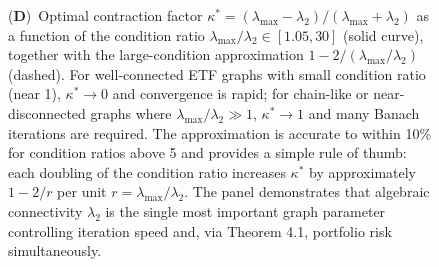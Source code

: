 \begin{figure}[!htbp]
{    (\textbf{D})~Optimal contraction factor $\kappa^* = (\lambda_{\max} - \lambda_2)/(\lambda_{\max} + \lambda_2)$ as a function of the condition ratio $\lambda_{\max}/\lambda_2 \in [1.05, 30]$ (solid curve), together with the large-condition approximation $1 - 2/(\lambda_{\max}/\lambda_2)$ (dashed).  For well-connected ETF graphs with small condition ratio (near 1), $\kappa^* \to 0$ and convergence is rapid; for chain-like or near-disconnected graphs where $\lambda_{\max}/\lambda_2 \gg 1$, $\kappa^* \to 1$ and many Banach iterations are required.  The approximation is accurate to within 10\% for condition ratios above 5 and provides a simple rule of thumb: each doubling of the condition ratio increases $\kappa^*$ by approximately $1 - 2/r$ per unit $r = \lambda_{\max}/\lambda_2$.  The panel demonstrates that algebraic connectivity $\lambda_2$ is the single most important graph parameter controlling iteration speed and, via Theorem 4.1, portfolio risk simultaneously.}
    \label{fig:etf_panel_2}
\end{figure}


